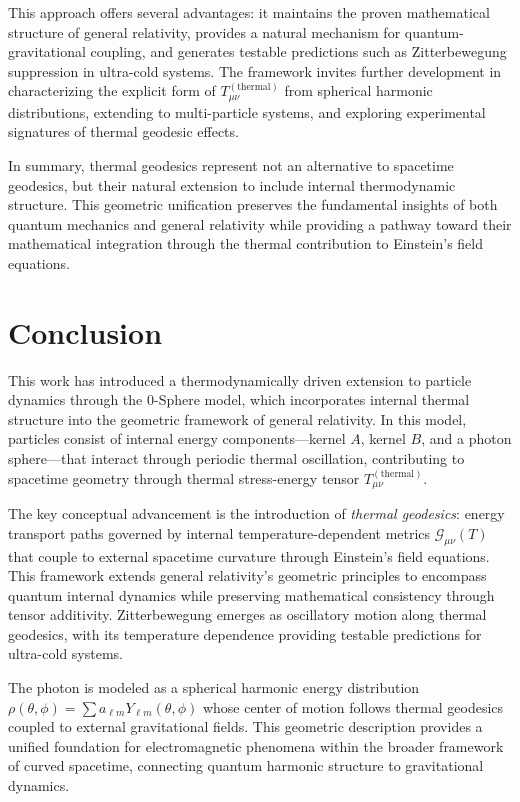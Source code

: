 \documentclass[%
 reprint,
 amsmath,amssymb,
 aps,
]{revtex4-1}
\numberwithin{equation}{section}%
\begin{document}
This approach offers several advantages: it maintains the proven mathematical structure of general relativity, provides a natural mechanism for quantum-gravitational coupling, and generates testable predictions such as Zitterbewegung suppression in ultra-cold systems. The framework invites further development in characterizing the explicit form of $T_{\mu\nu}^{(\text{thermal})}$ from spherical harmonic distributions, extending to multi-particle systems, and exploring experimental signatures of thermal geodesic effects.

In summary, thermal geodesics represent not an alternative to spacetime geodesics, but their natural extension to include internal thermodynamic structure. This geometric unification preserves the fundamental insights of both quantum mechanics and general relativity while providing a pathway toward their mathematical integration through the thermal contribution to Einstein's field equations.


\section{Conclusion}

This work has introduced a thermodynamically driven extension to particle dynamics through the 0-Sphere model, which incorporates internal thermal structure into the geometric framework of general relativity. In this model, particles consist of internal energy components—kernel $A$, kernel $B$, and a photon sphere—that interact through periodic thermal oscillation, contributing to spacetime geometry through thermal stress-energy tensor $T_{\mu\nu}^{(\text{thermal})}$.

The key conceptual advancement is the introduction of \textit{thermal geodesics}: energy transport paths governed by internal temperature-dependent metrics $\mathcal{G}_{\mu\nu}(T)$ that couple to external spacetime curvature through Einstein's field equations. This framework extends general relativity's geometric principles to encompass quantum internal dynamics while preserving mathematical consistency through tensor additivity. Zitterbewegung emerges as oscillatory motion along thermal geodesics, with its temperature dependence providing testable predictions for ultra-cold systems.

The photon is modeled as a spherical harmonic energy distribution $\rho(\theta,\phi) = \sum a_{\ell m} Y_{\ell m}(\theta,\phi)$ whose center of motion follows thermal geodesics coupled to external gravitational fields. This geometric description provides a unified foundation for electromagnetic phenomena within the broader framework of curved spacetime, connecting quantum harmonic structure to gravitational dynamics.
\end{document}

